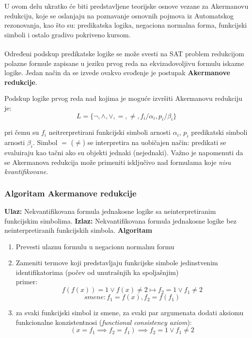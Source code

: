 \documentclass[a4paper]{article}
\begin{document}
U ovom delu ukratko će biti predstavljene teorijske osnove vezane za Akermanovu redukciju, koje se oslanjaju na poznavanje osnovnih pojmova iz Automatskog rezonovanja, kao što su: predikatska logika, negaciona normalna forma, funkcijski simboli i ostalo gradivo pokriveno kursom. \\\\ 
Određeni podskup predikatske logike se može svesti na SAT problem redukcijom polazne formule zapisane u jeziku prvog reda na ekvizadovoljivu formulu iskazne logike. Jedan način da se izvede ovakvo svođenje je postupak \textbf{Akermanove redukcije}.

Podskup logike prvog reda nad kojima je moguće izvršiti Akermanovu redukciju je:
$$ L = \{\neg, \land, \lor, =, \neq, f_i/\alpha_i, p_i/\beta_i\}$$

pri čemu su $f_i$ neitrerpretirani funkcijski simboli arnosti $\alpha_i$, $p_i$ predikatski simboli arnosti $\beta_i$. Simbol $=$ ($\neq$) se interpretira na uobičajen način: predikati se evaluiraju kao tačni ako su objekti jednaki (nejednaki). Važno je napomenuti da se Akermanova redukcija može primeniti isključivo nad formulama koje \textit{nisu kvantifikovane}.

\subsubsection*{Algoritam Akermanove redukcije}
\textbf{Ulaz:} Nekvantifikovana formula jednakosne logike sa neinterpretiranim funkcijskim simbolima.
\textbf{Izlaz:} Nekvantifikovana formula jednakosne logike bez neinterpretiranih funkcijskih simbola.
\textbf{Algoritam}
\begin{enumerate}
	\item Prevesti ulaznu formulu u negacionu normalnu formu
	\item Zameniti termove koji predstavljaju funkcijske simbole jedinstvenim identifikatorima (počev od unutrašnjih ka spoljašnjim)\\
	primer:\\
	$$f(f(x)) = 1 \lor f(x) \neq 2 \mapsto f_2 = 1 \lor f_1 \neq 2$$
	$$smene: f_1 = f(x), f_2 = f(f_1)$$
	\item za svaki funkcijski simbol iz smene, za svaki par argumenata dodati aksiomu funkcionalne konzistentnosi (\textit{functional consistency axiom}):
	$$(x = f_1 \implies f_2 = f_1) \implies f_2 = 1 \lor f_1 \neq 2$$
\end{enumerate}
\end{document}
